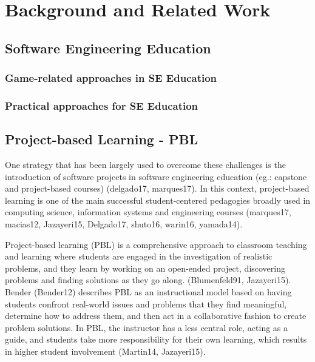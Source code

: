 \chapter{Background and Related Work}
\label{ch:background}

\section{Software Engineering Education}

\subsection{Game-related approaches in SE Education}



\subsection{Practical approaches for SE Education}

\section{Project-based Learning - PBL}

One strategy that has been largely used to overcome these challenges is the introduction of software projects in software engineering education (eg.: capstone and project-based courses) (delgado17, marques17). In this context, project-based learning is one of the main successful student-centered pedagogies broadly used in computing science, information systems and engineering courses (marques17, macias12, Jazayeri15, Delgado17, shuto16, warin16, yamada14).

Project-based learning (PBL) is a comprehensive approach to classroom teaching and learning where students are engaged in the investigation of realistic problems, and they learn by working on an open-ended project, discovering problems and finding solutions as they go along. (Blumenfeld91, Jazayeri15). Bender (Bender12) describes PBL as an instructional model based on having students confront real-world issues and problems that they find meaningful, determine how to address them, and then act in a collaborative fashion to create problem solutions. In PBL, the instructor has a less central role, acting as a guide, and students take more responsibility for their own learning, which results in higher student involvement (Martin14, Jazayeri15).

